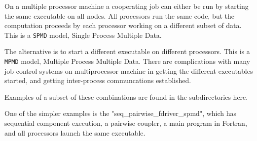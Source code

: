 \begin{description}
On a multiple processor machine a cooperating job can either be run
by starting the same executable on all nodes.  All processors run the
same code, but the computation proceeds by each processor working on
a different subset of data.  This is a {\tt SPMD} model, Single Process
Multiple Data.  

The alternative is to start a different executable on different
processors.  This is a {\tt MPMD} model, Multiple Process Multiple Data.
There are complications with many job control systems on multiprocessor
machine in getting the different executables started, and getting
inter-process communcations established.

\end{description}


Examples of a subset of these combinations are found in the
subdirectories here.

One of the simpler examples is the "seq_pairwise_fdriver_spmd", which
has sequential component execution, a pairwise coupler, a main program
in Fortran, and all processors launch the same executable.

